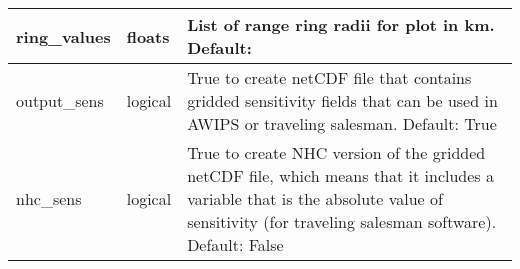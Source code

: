 \documentclass[psfig,12pt]{article}
\begin{document}
\begin{table}[H]
\begin{center}
\begin{tabular}{|p{1.25in}|p{0.5in}|p{4.5in}|}
ring\_values & floats & List of range ring radii for plot in km.  Default:  \\ \hline
output\_sens & logical & True to create netCDF file that contains gridded sensitivity 
fields that can be used in AWIPS or traveling salesman.  Default:  True \\ \hline
nhc\_sens & logical & True to create NHC version of the gridded netCDF file, which means that
it includes a variable that is the absolute value of sensitivity (for traveling salesman software).
Default:  False \\ \hline
\end{tabular}
\end{center}
\end{table}
\end{document}
